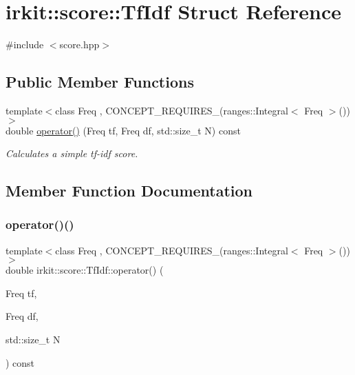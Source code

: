 \hypertarget{structirkit_1_1score_1_1TfIdf}{}\section{irkit\+:\+:score\+:\+:Tf\+Idf Struct Reference}
\label{structirkit_1_1score_1_1TfIdf}


{\ttfamily \#include $<$score.\+hpp$>$}

\subsection*{Public Member Functions}
\begin{DoxyCompactItemize}
\item 
{\footnotesize template$<$class Freq , C\+O\+N\+C\+E\+P\+T\+\_\+\+R\+E\+Q\+U\+I\+R\+E\+S\+\_\+(ranges\+::\+Integral$<$ Freq $>$()) $>$ }\\double \mbox{\hyperlink{structirkit_1_1score_1_1TfIdf_aec3bfcf0c8c5d174cd8a0af50429f47a}{operator()}} (Freq tf, Freq df, std\+::size\+\_\+t N) const
\begin{DoxyCompactList}\small\item\em Calculates a simple tf-\/idf score. \end{DoxyCompactList}\end{DoxyCompactItemize}


\subsection{Member Function Documentation}
\mbox{\label{structirkit_1_1score_1_1TfIdf_aec3bfcf0c8c5d174cd8a0af50429f47a}} 
\subsubsection{\texorpdfstring{operator()()}{operator()()}}
{\footnotesize\ttfamily template$<$class Freq , C\+O\+N\+C\+E\+P\+T\+\_\+\+R\+E\+Q\+U\+I\+R\+E\+S\+\_\+(ranges\+::\+Integral$<$ Freq $>$()) $>$ \\
double irkit\+::score\+::\+Tf\+Idf\+::operator() (\begin{DoxyParamCaption}\item[{Freq}]{tf,  }\item[{Freq}]{df,  }\item[{std\+::size\+\_\+t}]{N }\end{DoxyParamCaption}) const\hspace{0.3cm}{\ttfamily [inline]}}



